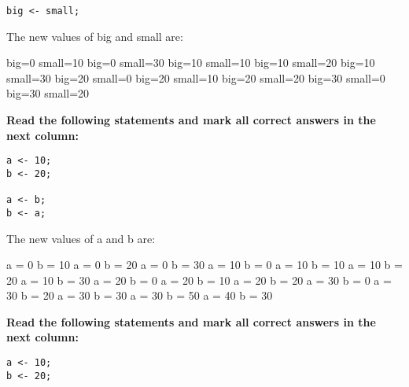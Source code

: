 \documentclass[10pt]{exam}
\begin{document}
\begin{questions}
\begin{minipage}[t][][t]{0.18\textwidth}
\begin{lstlisting}
big <- small;    
  \end{lstlisting}
\end{minipage}
  \hfill
\begin{minipage}[t][][t]{0.75\textwidth}
  The new values of big and small are:
  \begin{multicols*}{3}
\begin{checkboxes}
    \choice big=0 small=10
    \choice big=0 small=30
    \choice big=10 small=10
    \choice big=10 small=20
    \choice big=10 small=30
    \choice big=20 small=0
    \choice big=20 small=10
    \choice big=20 small=20
    \choice big=30 small=0
    \choice big=30 small=20
  \end{checkboxes}
\end{multicols*}
\end{minipage}

\vspace{1cm}  \begin{minipage}[t][][t]{0.18\textwidth}
\question \bf Read the following statements and mark all correct answers in the next column: \raggedright
  \begin{lstlisting}
a <- 10;
b <- 20;

a <- b;
b <- a;
  \end{lstlisting}
\end{minipage}
  \hfill
\begin{minipage}[t][][t]{0.75\textwidth}
  The new values of a and b are:
  \begin{multicols*}{3}
\begin{checkboxes}
    \choice a = 0 b = 10
    \choice a = 0 b = 20
    \choice a = 0 b = 30
    \choice a = 10 b = 0
    \choice a = 10 b = 10
    \choice a = 10 b = 20
    \choice a = 10 b = 30
    \choice a = 20 b = 0
    \choice a = 20 b = 10
    \choice a = 20 b = 20
    \choice a = 30 b = 0
    \choice a = 30 b = 20
    \choice a = 30 b = 30
    \choice a = 30 b = 50
    \choice a = 40 b = 30
  \end{checkboxes}
\end{multicols*}
\end{minipage}

\vspace{1cm}  \begin{minipage}[t][][t]{0.18\textwidth}
\question \bf Read the following statements and mark all correct answers in the next column: \raggedright
  \begin{lstlisting}
a <- 10;
b <- 20;


\end{lstlisting}
\end{minipage}
\end{questions}
\end{document}
